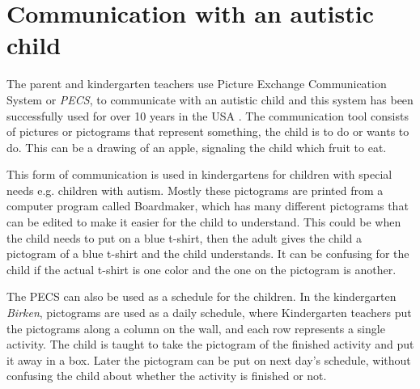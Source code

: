 \section{Communication with an autistic child}
The parent and kindergarten teachers use Picture Exchange Communication System or \emph{PECS}, to communicate with an autistic child and this system has been successfully used for over 10 years in the USA \cite{centerAutism}. The communication tool consists of pictures or pictograms that represent something, the child is to do or wants to do. This can be a drawing of an apple, signaling the child which fruit to eat. 

This form of communication is used in kindergartens for children with special needs e.g. children with autism. Mostly these pictograms are printed from a computer program called Boardmaker, which has many different pictograms that can be edited to make it easier for the child to understand. This could be when the child needs to put on a blue t-shirt, then the adult gives the child a pictogram of a blue t-shirt and the child understands. It can be confusing for the child if the actual t-shirt is one color and the one on the pictogram is another.

The PECS can also be used as a schedule for the children. In the kindergarten \emph{Birken}, pictograms are used as a daily schedule, where Kindergarten teachers put the pictograms along a column on the wall, and each row represents a single activity.
The child is taught to take the pictogram of the finished activity and put it away in a box. Later the pictogram can be put on next day's schedule, without confusing the child about whether the activity is finished or not.
